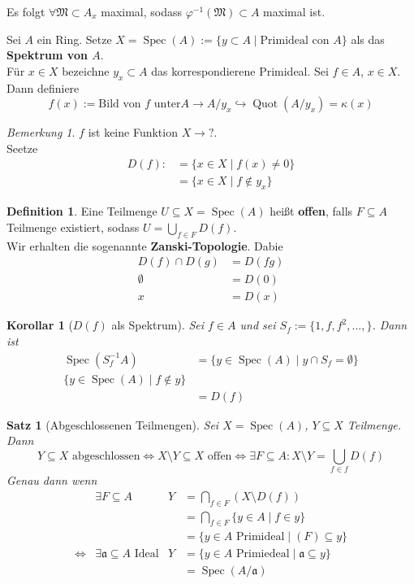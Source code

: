 \documentclass[10pt,a4paper]{article}
\newcommand{\Quot}{\operatorname{Quot}}
\newcommand{\Spec}{\ensuremath{\operatorname{Spec}}}
\newcounter{thm}[section]
\theoremstyle{definition}
\newtheorem{definition}[thm]{Definition}
\theoremstyle{plain}
\newtheorem{kor}[thm]{Korollar}
\newtheorem{satz}[thm]{Satz}
\theoremstyle{remark}
\newtheorem{bem}[thm]{Bemerkung}
\begin{document}
Es folgt $\forall \mathfrak M\subset A_x$ maximal, sodass $\varphi^{-1}(\mathfrak M)\subset A$ maximal ist.\\
\begin{def}
	\label{satz414}
	Sei $A$ ein Ring. Setze $X=\Spec(A):=\{y\subset A\mid\text{Primideal con $A$}\}$ als das \textbf{Spektrum von $A$}.\\
	Für $x\in X$ bezeichne $y_x\subset A$ das korrespondierene Primideal.
	Sei $f\in A$, $x\in X$. Dann definiere
	\[f(x):=\text{Bild von $f$ unter}A\rightarrow A/y_x\hookrightarrow\Quot(A/y_x)=\kappa(x)\]
\end{def}
\begin{bem}
	$f$ ist keine Funktion $X\rightarrow ?$.\\
	Seetze
	\begin{align*}
	D(f):&=\{x\in X\mid f(x)\neq 0\}\\
	&=\{x\in X\mid f\notin y_x\}
	\end{align*}
\end{bem}
\begin{definition}
	Eine Teilmenge $U\subseteq X=\Spec(A)$ heißt \textbf{offen}, falls $F\subseteq A$ Teilmenge existiert, sodass $U=\bigcup_{f\in F}D(f)$.\\
	Wir erhalten die sogenannte \textbf{Zanski-Topologie}.
	Dabie
	\begin{align*}
	D(f)\cap D(g)&=D(fg)\\
	\emptyset&=D(0)\\
	x&=D(x)
	\end{align*} 
\end{definition}
\begin{kor}[$D(f)$ als Spektrum]
	Sei $f\in A$ und sei $S_f:=\{1,f,f^2,...,\}$. Dann ist\begin{align*}
	\Spec(S^{-1}_fA)&=\{y\in\Spec(A)\mid y\cap S_f=\emptyset\}\\
	\{y\in\Spec(A)\mid f\notin y\}\\
	&=D(f)
	\end{align*}
\end{kor}
\begin{satz}[Abgeschlossenen Teilmengen]
	Sei $X=\Spec(A)$, $Y\subseteq X$ Teilmenge. Dann
	\[\text{$Y\subseteq X$ abgeschlossen}
	\Leftrightarrow \text{$X\setminus Y\subseteq X$ offen}
	\Leftrightarrow \exists F\subseteq A:X\setminus Y=\bigcup_{f\in f}D(f)\]
	Genau dann wenn
	\begin{align*}
	&\exists F\subseteq A&Y&=\bigcap_{f\in F}(X\setminus D(f))\\
	&&&=\bigcap_{f\in F}\{y\in A\mid f\in y\}\\
	&&&=\{y\in A\text{ Primideal}\mid(F)\subseteq y\}\\
	\Leftrightarrow&\exists\mathfrak a\subseteq A\text{ Ideal}&Y&=\{y\in A\text{ Primiedeal}\mid\mathfrak a\subseteq y\}\\
	&&&=\Spec(A/\mathfrak a)
	\end{align*}
\end{satz}
\end{document}
